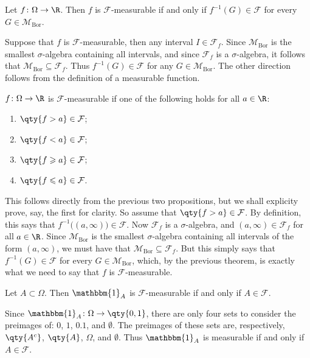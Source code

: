 \documentclass{maths}
\newcommand{\mbor}{\mathcal{M}_{\text{Bor}}}
\newcommand{\alg}{\mathcal{F}}
\newcommand{\ind}{\mathbbm{1}}
\begin{document}
\begin{thm}
    Let $f\colon\Omega\to\R$.
    Then $f$ is $\alg$-measurable if and only if $f^{-1}(G)\in\alg$ for every $G\in\mbor$.
\end{thm}

\begin{prf}
    Suppose that $f$ is $\alg$-measurable, then any interval $I\in\alg_f$.
    Since $\mbor$ is the smallest $\sigma$-algebra containing all intervals, and since $\alg_f$ is a $\sigma$-algebra, it follows that $\mbor\subseteq\alg_f$.
    Thus $f^{-1}(G)\in\alg$ for any $G\in\mbor$.
    The other direction follows from the definition of a measurable function.
\end{prf}

\begin{prop}
    $f\colon\Omega\to\R$ is $\alg$-measurable if one of the following holds for all $a\in\R$:
    \begin{enumerate}
        \item $\qty{f > a}\in\alg$;
        \item $\qty{f < a}\in\alg$;
        \item $\qty{f \geqslant a}\in\alg$;
        \item $\qty{f \leqslant a}\in\alg$.
    \end{enumerate}
\end{prop}

\begin{prf}
    This follows directly from the previous two propositions, but we shall explicity prove, say, the first for clarity.
    So assume that $\qty{f>a}\in\alg$.
    By definition, this says that $f^{-1}\big((a,\infty)\big)\in\alg$.
    Now $\alg_f$ is a $\sigma$-algebra, and $(a,\infty)\in\alg_f$ for all $a\in\R$.
    Since $\mbor$ is the smallest $\sigma$-algebra containing all intervals of the form $(a,\infty)$, we must have that $\mbor\subseteq\alg_f$.
    But this simply says that $f^{-1}(G)\in\alg$ for every $G\in\mbor$, which, by the previous theorem, is exactly what we need to say that $f$ is $\alg$-measurable.
\end{prf}

\begin{prop}
    Let $A\subset\Omega$.
    Then $\ind_A$ is $\alg$-measurable if and only if $A\in\alg$.
\end{prop}

\begin{prf}
    Since $\ind_A\colon\Omega\to\qty{0,1}$, there are only four sets to consider the preimages of: $\qty{0}$, $\qty{1}$, $\qty{0,1}$, and $\emptyset$.
    The preimages of these sets are, respectively, $\qty{A^c}$, $\qty{A}$, $\Omega$, and $\emptyset$.
    Thus $\ind_A$ is measurable if and only if $A\in\alg$.
\end{prf}
\end{document}
